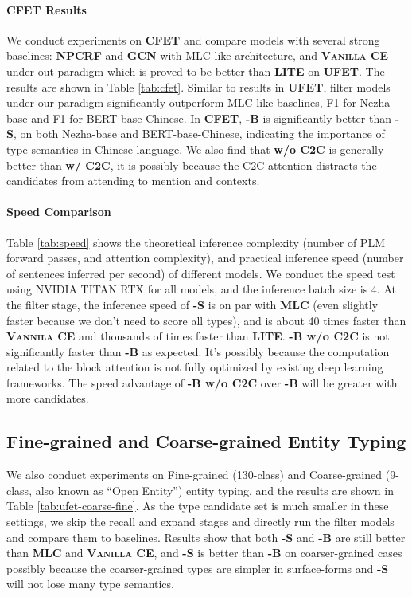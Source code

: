 \documentclass[11pt]{article}
\begin{document}
\paragraph{CFET Results} We conduct experiments on {\bf \textsc{CFET}} and compare {\bf \textsc{\name}} models with several strong baselines:  {\bf \textsc{NPCRF}} and {\bf \textsc{GCN}} with MLC-like architecture, and {\bf \textsc{Vanilla CE}} under out paradigm which is proved to be better than {\bf \textsc{LITE}} on {\bf \textsc{UFET}}. The results are shown in Table \ref{tab:cfet}. Similar to results in {\bf \textsc{UFET}}, filter models under our paradigm significantly outperform MLC-like baselines,  F1 for Nezha-base and  F1 for BERT-base-Chinese. In {\bf \textsc{CFET}}, {\bf \textsc{\name}-B} is significantly better than {\bf \textsc{\name}-S}, on both Nezha-base and BERT-base-Chinese, indicating the importance of type semantics in Chinese language. We also find that {\bf \textsc{\name} w/o C2C} is generally better than  {\bf \textsc{\name} w/ C2C}, it is possibly because the C2C attention distracts the candidates from attending to mention and contexts.
\paragraph{Speed Comparison} Table \ref{tab:speed} shows the theoretical inference complexity (number of PLM forward passes, and attention complexity), and practical inference speed (number of sentences inferred per second) of different models. We conduct the speed test using NVIDIA TITAN RTX for all models, and the inference batch size is 4.
At the filter stage, the inference speed of {\bf \textsc{\name-S}} is on par with {\bf \textsc{MLC}} (even slightly faster because we don't need to score all types), and is about 40 times faster than {\bf \textsc{Vannila CE}} and thousands of times faster than {\bf \textsc{LITE}}. {\bf \textsc{\name-B w/o C2C}} is not significantly faster than {\bf \textsc{\name-B}} as expected. It's possibly because the computation related to the block attention is not fully optimized by existing deep learning frameworks. The speed advantage of {\bf \textsc{\name-B w/o C2C}} over {\bf \textsc{\name-B}} will be greater with more candidates.


\subsection{Fine-grained and Coarse-grained Entity Typing}
We also conduct experiments on Fine-grained (130-class) and Coarse-grained (9-class, also known as ``Open Entity'') entity typing, and the results are shown in Table \ref{tab:ufet-coarse-fine}. As the type candidate set is much smaller in these settings, we skip the recall and expand stages and directly run the filter models and compare them to baselines. Results show that both {\bf \textsc{\name}-S} and {\bf \textsc{\name}-B} are still better than {\bf \textsc{MLC}} and {\bf \textsc{Vanilla CE}}, and {\bf \textsc{\name}-S} is better than {\bf \textsc{\name}-B} on coarser-grained cases possibly because the coarser-grained types are simpler in surface-forms and {\bf \textsc{\name}-S} will not lose many type semantics.
\end{document}
